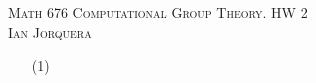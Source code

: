 \documentclass[12pt]{amsart}
\begin{document}
\begin{center}
   \textsc{Math 676 Computational Group Theory. HW 2\\ Ian Jorquera}
\end{center}
\vspace{1em}

\begin{itemize}
   \item[(1)]

\end{itemize}
\end{document}
